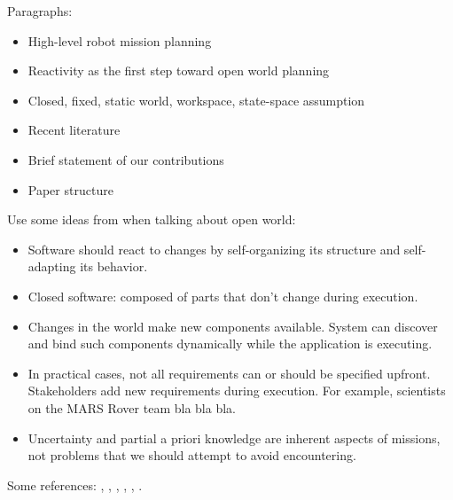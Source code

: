 Paragraphs:
\begin{itemize}
	\item High-level robot mission planning
	\item Reactivity as the first step toward open world planning
  	\item Closed, fixed, static world, workspace, state-space assumption
 	\item Recent literature
   	\item Brief statement of our contributions
   	\item Paper structure
\end{itemize}

Use some ideas from \cite{open-world-sw} when talking about open world:
\begin{itemize}
	\item Software should react to changes by self-organizing its structure and self-adapting its behavior.
	\item Closed software: composed of parts that don't change during execution.
	\item Changes in the world make new components available. System can discover and bind such components dynamically while the application is executing.
	\item In practical cases, not all requirements can or should be specified upfront. Stakeholders add new requirements during execution. For example, scientists on the MARS Rover team bla bla bla.
	\item Uncertainty and partial a priori knowledge are inherent aspects of missions, not problems that we should attempt to avoid encountering.
\end{itemize}

Some references: \cite{MurrayICRA2012}, \cite{MurrayICRA2013a},  \cite{BeltaICRA2012}, \cite{Dimos2013ICRA}, \cite{Belta2013RSS}, \cite{BingxinRSS2012}.